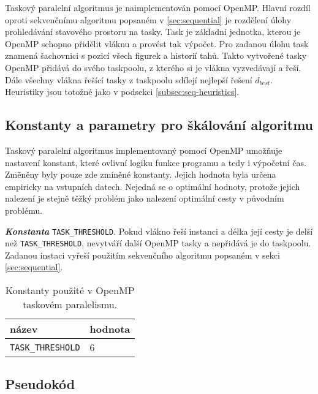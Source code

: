 \documentclass{article}
\newcommand{\const}[1]{\texttt{#1}}
\newcommand{\konstanta}[1]{\textbf{\textit{Konstanta}} \const{#1}.}
\begin{document}
    Taskový paralelní algoritmus je naimplementován pomocí OpenMP. Hlavní rozdíl oproti sekvenčnímu algoritmu
    popsaném v \ref{sec:sequential} je rozdělení úlohy prohledávání stavového prostoru na tasky. Task je
    základní jednotka, kterou je OpenMP schopno přidělit vláknu a provést tak výpočet. Pro zadanou úlohu
    task znamená šachovnici s pozicí všech figurek a historií tahů. Takto vytvořené tasky OpenMP přidává
    do svého taskpoolu, z kterého si je vlákna vyzvedávají a řeší. Dále všechny vlákna řešící tasky z
    taskpoolu sdílejí nejlepší řešení $d_{best}$. Heuristiky jsou totožné jako v podsekci \ref{subsec:seq-heuristics}.

    \subsection{Konstanty a parametry pro škálování algoritmu}
    Taskový paralelní algoritmus implementovaný pomocí OpenMP umožňuje nastavení konstant, které ovlivní
    logiku funkce programu a tedy i výpočetní čas. Změněny byly pouze zde zmíněné konstanty. Jejich hodnota
    byla určena empiricky na vstupních datech. Nejedná se o optimální hodnoty, protože jejich nalezení je
    stejně těžký problém jako nalezení optimální cesty v původním problému.

    \konstanta{TASK_THRESHOLD}  Pokud vlákno řeší instanci a délka její cesty je delší než \const{TASK_THRESHOLD}, nevytváří další
    OpenMP tasky a nepřidává je do taskpoolu. Zadanou instaci vyřeší použitím sekvenčního algoritmu popsaném v sekci \ref{sec:sequential}.

    \begin{table}[hb]
        \centering
        \begin{tabular}{|l|l|}
            \hline
            název                  & hodnota \\ \hline
            \const{TASK_THRESHOLD} & 6       \\ \hline
        \end{tabular}
        \caption{Konstanty použité v OpenMP taskovém paralelismu.}
        \label{tab:data-par-constants}
    \end{table}

    \subsection{Pseudokód}
\end{document}

